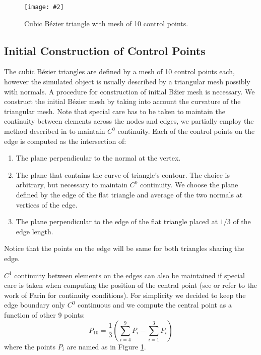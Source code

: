 \documentclass{egpubl}
\newcommand{\Figure}[3]{%
\begin{figure}[htb]
  \centering
  \texttt{[image: \#2]}
  \caption{\label{fig-#2}#3}
\end{figure}}
\begin{document}
\Figure{0.6\linewidth}{bezier2}
{Cubic B\'ezier triangle with mesh of 10 control points.}


\subsection{Initial Construction of Control Points} %

The cubic B\'ezier triangles are defined by a mesh of 10 control points each, however the
simulated object is usually described by a triangular mesh possibly with normals.
A procedure for construction of initial B\'zier mesh is necessary.
We construct the initial B\'ezier mesh by taking into account the curvature of the triangular
mesh. Note that special care has to be taken to maintain
the continuity between elements across the nodes and edges, 
we partially employ the method described in \cite{Ubach2010} to maintain
$C^0$ continuity. Each of the control points on the edge is
computed as the intersection of:

\begin{enumerate}
    \item The plane perpendicular to the normal at the vertex.
    \item The plane that contains the curve of triangle's contour. The
        choice is arbitrary, but necessary to maintain $C^0$ continuity. 
        We choose the plane defined by the edge of the flat triangle and
        average of the two normals at vertices of the edge. 
    \item The plane perpendicular to the edge of the flat triangle placed at
        $1/3$ of the edge length.
\end{enumerate}

Notice that the points on the edge will be same for both triangles sharing
the edge.

$C^1$ continuity between elements on the edges can also be maintained if special care is taken
when computing the position of the central point
(see \cite{Ubach2010} or refer to the work of Farin \cite{Farin2002} for continuity conditions). 
For simplicity we decided to keep the edge boundary only $C^0$ continuous and we compute the central point as a function of other 9 points: 
%
\begin{equation}\label{eq-central}
    P_{10} = \frac{1}{3}(\sum_{i=4}^9 P_i - \sum_{i=1}^3 P_i)
\end{equation}
%
where the points $P_i$ are named as in Figure \ref{fig-bezier2}.
\end{document}
